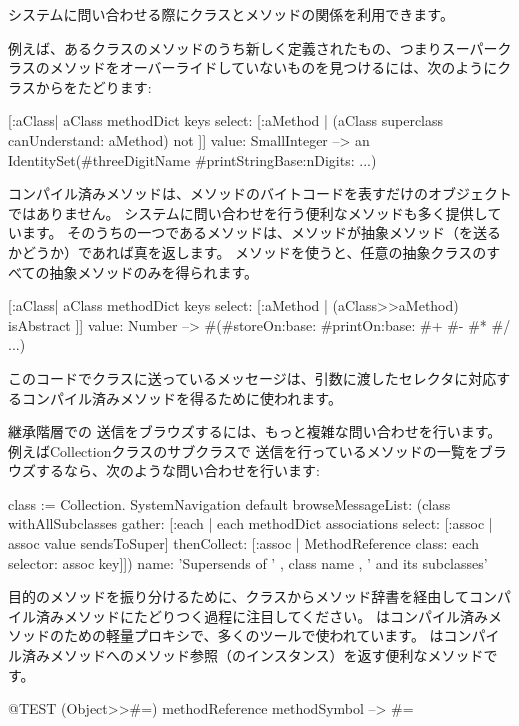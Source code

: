 \documentclass[a4paper,10pt,twoside]{book}
\begin{document}
システムに問い合わせる際にクラスとメソッドの関係を利用できます。

例えば、あるクラスのメソッドのうち新しく定義されたもの、つまりスーパークラスのメソッドをオーバーライドしていないものを見つけるには、次のようにクラスからをたどります:
\begin{code}{}
[:aClass| aClass methodDict keys select: [:aMethod |
  (aClass superclass canUnderstand: aMethod) not ]] value: SmallInteger
  --> an IdentitySet(#threeDigitName #printStringBase:nDigits: ...)
\end{code}

コンパイル済みメソッドは、メソッドのバイトコードを表すだけのオブジェクトではありません。
システムに問い合わせを行う便利なメソッドも多く提供しています。
そのうちの一つであるメソッドは、メソッドが抽象メソッド（を送るかどうか）であれば真を返します。
メソッドを使うと、任意の抽象クラスのすべての抽象メソッドのみを得られます。
\begin{code}{}
[:aClass| aClass methodDict keys select: [:aMethod |
  (aClass>>aMethod) isAbstract ]] value: Number
  --> #(#storeOn:base: #printOn:base: #+ #- #* #/ ...)
\end{code}
このコードでクラスに送っている\ct{>>}メッセージは、引数に渡したセレクタに対応するコンパイル済みメソッドを得るために使われます。


継承階層での \super 送信をブラウズするには、もっと複雑な問い合わせを行います。
例えばCollectionクラスのサブクラスで \super 送信を行っているメソッドの一覧をブラウズするなら、次のような問い合わせを行います:
\begin{code}{}
class := Collection.
SystemNavigation default
  browseMessageList: (class withAllSubclasses gather: [:each |
    each methodDict associations
      select: [:assoc | assoc value sendsToSuper]
      thenCollect: [:assoc | MethodReference class: each selector: assoc key]])
  name: 'Supersends of ' , class name , ' and its subclasses'
\end{code}

目的のメソッドを振り分けるために、クラスからメソッド辞書を経由してコンパイル済みメソッドにたどりつく過程に注目してください。
はコンパイル済みメソッドのための軽量プロキシで、多くのツールで使われています。
はコンパイル済みメソッドへのメソッド参照（のインスタンス）を返す便利なメソッドです。
\begin{code}{@TEST}
(Object>>#=) methodReference methodSymbol --> #=
\end{code}
\end{document}
